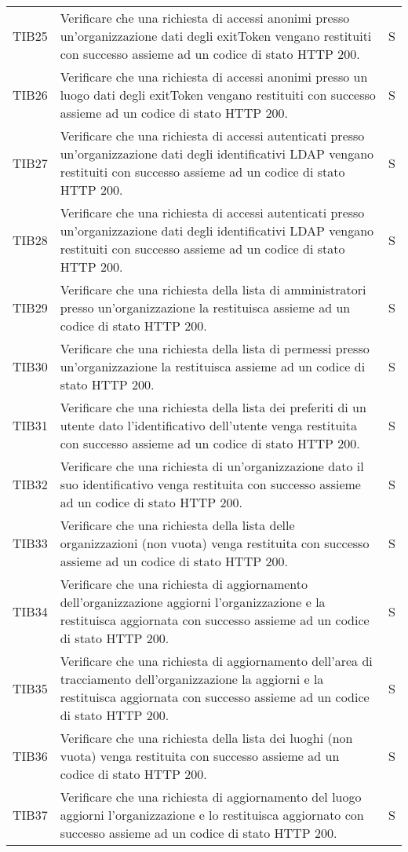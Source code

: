 {\begin{longtable}{ c C{13cm} C{1cm}}
TIB25 & Verificare che una richiesta di accessi anonimi presso un'organizzazione dati degli exitToken vengano restituiti con successo assieme ad un codice di stato HTTP 200. & S \\
TIB26 & Verificare che una richiesta di accessi anonimi presso un luogo dati degli exitToken vengano restituiti con successo assieme ad un codice di stato HTTP 200. & S \\
TIB27 & Verificare che una richiesta di accessi autenticati presso un'organizzazione dati degli identificativi LDAP vengano restituiti con successo assieme ad un codice di stato HTTP 200. & S \\
TIB28 & Verificare che una richiesta di accessi autenticati presso un'organizzazione dati degli identificativi LDAP vengano restituiti con successo assieme ad un codice di stato HTTP 200. & S \\
TIB29 & Verificare che una richiesta della lista di amministratori presso un'organizzazione la restituisca assieme ad un codice di stato HTTP 200. & S \\
TIB30 & Verificare che una richiesta della lista di permessi presso un'organizzazione la restituisca assieme ad un codice di stato HTTP 200. & S \\
TIB31 & Verificare che una richiesta della lista dei preferiti di un utente dato l'identificativo dell'utente venga restituita con successo assieme ad un codice di stato HTTP 200. & S \\
TIB32 & Verificare che una richiesta di un'organizzazione dato il suo identificativo venga restituita con successo assieme ad un codice di stato HTTP 200. & S \\
TIB33 & Verificare che una richiesta della lista delle organizzazioni (non vuota) venga restituita con successo assieme ad un codice di stato HTTP 200. & S \\
TIB34 & Verificare che una richiesta di aggiornamento dell'organizzazione aggiorni l'organizzazione e la restituisca aggiornata con successo assieme ad un codice di stato HTTP 200. & S \\
TIB35 & Verificare che una richiesta di aggiornamento dell'area di tracciamento dell'organizzazione la aggiorni e la restituisca aggiornata con successo assieme ad un codice di stato HTTP 200. & S \\
TIB36 & Verificare che una richiesta della lista dei luoghi (non vuota) venga restituita con successo assieme ad un codice di stato HTTP 200. & S \\
TIB37 & Verificare che una richiesta di aggiornamento del luogo aggiorni l'organizzazione e lo restituisca aggiornato con successo assieme ad un codice di stato HTTP 200. & S \\

\end{longtable}}
